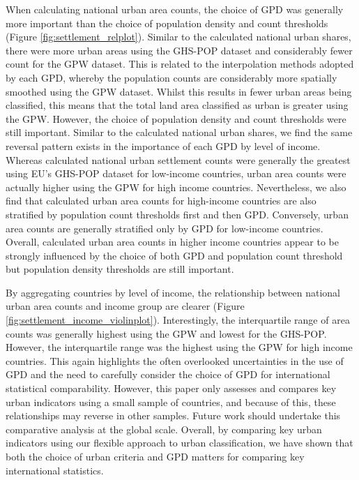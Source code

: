 \documentclass[review]{elsarticle}
\begin{document}
	
	When calculating national urban area counts, the choice of GPD was generally more important than the choice of population density and count thresholds (Figure \ref{fig:settlement_relplot}).
	Similar to the calculated national urban shares, there were more urban areas using the GHS-POP dataset and considerably fewer count for the GPW dataset.
	This is related to the interpolation methods adopted by each GPD, whereby the population counts are considerably more spatially smoothed using the GPW dataset.
	Whilst this results in fewer urban areas being classified, this means that the total land area classified as urban is greater using the GPW. 
	However, the choice of population density and count thresholds were still important.
	Similar to the calculated national urban shares, we find the same reversal pattern exists in the importance of each GPD by level of income.
	Whereas calculated national urban settlement counts were generally the greatest using EU's GHS-POP dataset for low-income countries, urban area counts were actually higher using the GPW for high income countries.
	Nevertheless, we also find that calculated urban area counts for high-income countries are also stratified by population count thresholds first and then GPD.
	Conversely, urban area counts are generally stratified only by GPD for low-income countries. 
	Overall, calculated urban area counts in higher income countries appear to be strongly influenced by the choice of both GPD and population count threshold but population density thresholds are still important.
	
	
	By aggregating countries by level of income, the relationship between national urban area counts and income group are clearer (Figure \ref{fig:settlement_income_violinplot}).
	Interestingly, the interquartile range of area counts was generally highest using the GPW and lowest for the GHS-POP.
	However, the interquartile range was the highest using the GPW for high income countries.
	This again highlights the often overlooked uncertainties in the use of GPD and the need to carefully consider the choice of GPD for international statistical comparability.  
	However, this paper only assesses and compares key urban indicators using a small sample of countries, and because of this, these relationships may reverse in other samples.
	Future work should undertake this comparative analysis at the global scale.
	Overall, by comparing key urban indicators using our flexible approach to urban classification, we have shown that both the choice of urban criteria and GPD matters for comparing key international statistics.
	
\end{document}
